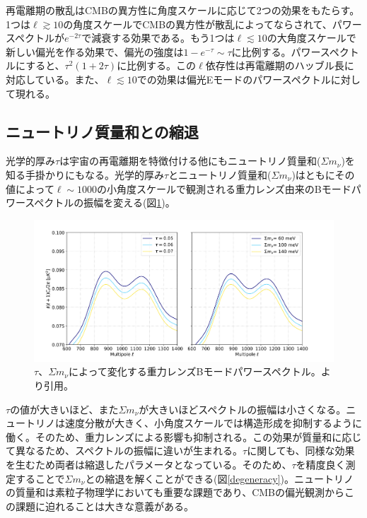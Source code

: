 再電離期の散乱はCMBの異方性に角度スケールに応じて2つの効果をもたらす。1つは$\ell\gtrsim 10$の角度スケールでCMBの異方性が散乱によってならされて、パワースペクトルが$e^{-2\tau}$で減衰する効果である。もう1つは$\ell\lesssim 10$の大角度スケールで新しい偏光を作る効果で、偏光の強度は$1-e^{-\tau}\sim\tau$に比例する。パワースペクトルにすると、$\tau^{2}(1+2\tau)$に比例する。この$\ell$依存性は再電離期のハッブル長に対応している。また、$\ell\lesssim 10$での効果は偏光Eモードのパワースペクトルに対して現れる。

\subsection{ニュートリノ質量和との縮退}
光学的厚み$\tau$は宇宙の再電離期を特徴付ける他にもニュートリノ質量和($\Sigma m_{\nu}$)を知る手掛かりにもなる。光学的厚み$\tau$とニュートリノ質量和($\Sigma m_{\nu}$)はともにその値によって$\ell\sim 1000$の小角度スケールで観測される重力レンズ由来のBモードパワースペクトルの振幅を変える(図\ref{tau_mass})。
\begin{figure}[htbp]
  \centering
  \includegraphics[width=0.8\columnwidth]{2_cosmology/figs/tau_mass.png}
  \caption{$\tau$、$\Sigma m_{\nu}$によって変化する重力レンズBモードパワースペクトル。\cite{sueno_doctor}より引用。}
  \label{tau_mass}
\end{figure}
$\tau$の値が大きいほど、また$\Sigma m_{\nu}$が大きいほどスペクトルの振幅は小さくなる。ニュートリノは速度分散が大きく、小角度スケールでは構造形成を抑制するように働く。そのため、重力レンズによる影響も抑制される。この効果が質量和に応じて異なるため、スペクトルの振幅に違いが生まれる。$\tau$に関しても、同様な効果を生むため両者は縮退したパラメータとなっている。そのため、$\tau$を精度良く測定することで$\Sigma m_{\nu}$との縮退を解くことができる(図\ref{degeneracy})。ニュートリノの質量和は素粒子物理学においても重要な課題であり、CMBの偏光観測からこの課題に迫れることは大きな意義がある。
